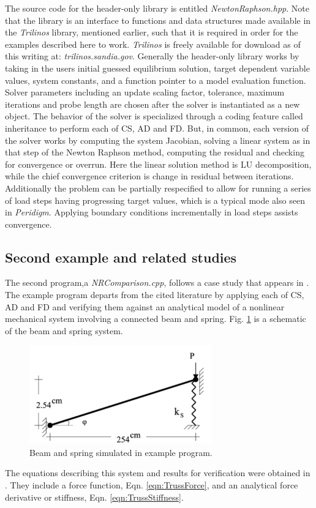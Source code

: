 \documentclass[preprint,12pt]{elsarticle}
\begin{document}
The source code for the header-only library is entitled \emph{NewtonRaphson.hpp}. Note that the library is an interface to functions and data structures made available in the \emph{Trilinos} library, mentioned earlier, such that it is required in order for the examples described here to work. \emph{Trilinos} is freely available for download as of this writing at: \emph{trilinos.sandia.gov}.  Generally the header-only library works by taking in the users initial guessed equilibrium solution, target dependent variable values, system constants, and a function pointer to a model evaluation function. Solver parameters including an update scaling factor, tolerance, maximum iterations and probe length are chosen after the solver is instantiated as a new object. The behavior of the solver is specialized through a coding feature called inheritance to perform each of CS, AD and FD.  But, in common, each version of the solver works by computing the system Jacobian, solving a linear system as in that step of the Newton Raphson method, computing the residual and checking for convergence or overrun. Here the linear solution method is LU decomposition, while the chief convergence criterion is change in residual between iterations.  Additionally the problem can be partially respecified to allow for running a series of load steps having progressing target values, which is a typical mode also seen in \emph{Peridigm}. Applying boundary conditions incrementally in load steps assists convergence.

\subsection{Second example and related studies} 
\label{subsec:Validation}
The second program,a \emph{NRComparison.cpp}, follows a case study that appears in \cite{rezaiee2010dynamic}. The example program departs from the cited literature by applying each of CS, AD and FD and verifying them against an analytical model of a nonlinear mechanical system involving a connected beam and spring. Fig. \ref{fig:TrussSchematic} is a schematic of the beam and spring system. 
%
\begin{figure}[tbp] \centering \includegraphics[width=0.7\textwidth]{./figs/truss.png}
\caption{Beam and spring simulated in example program.} \label{fig:TrussSchematic}
\end{figure}
%
The equations describing this system and results for verification were obtained
in \cite{rezaiee2010dynamic}. They include a force function, Eqn.
\ref{eqn:TrussForce}, and an analytical force derivative or stiffness, Eqn.
\ref{eqn:TrussStiffness}.
\end{document}
